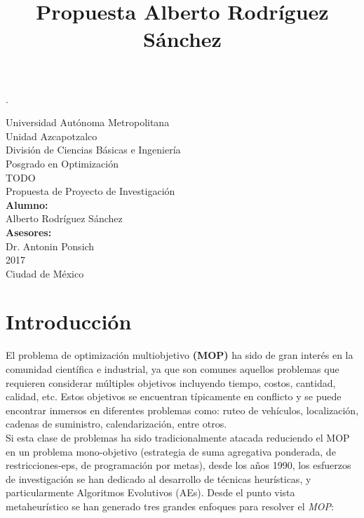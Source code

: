 \documentclass[letterpaper,10pt]{article}
\title{Propuesta Alberto Rodríguez Sánchez}
\begin{document}
\renewcommand{\refname}{Bibliografía}.
\thispagestyle{empty}

\begin{center}
    {\Huge Universidad Autónoma Metropolitana }\\
    {\huge Unidad Azcapotzalco}\\
    \vspace{0.5cm}
    {\Large División de Ciencias Básicas e Ingeniería}\\
    \vspace{1.0cm}
    {\large Posgrado en Optimización}\\
    \vspace{2.0cm}    
    {\Large TODO}\\
    \vspace{1.0cm}
    {\large Propuesta de Proyecto de Investigación}\\
    \vspace{2.0cm}
    {\large\textbf{Alumno:}}\\
    Alberto Rodríguez Sánchez\\
    \vspace{1.5cm}
    \bigskip
    {\large\textbf{Asesores:}}\\
    Dr. Antonin Ponsich\\
    
    \vspace{1.5cm}
     2017\\
    \vspace{1.0cm}
    Ciudad de México\\
\end{center}
\newpage
\tableofcontents
\newpage
\section{Introducción}

El problema de optimización multiobjetivo \textbf{(MOP)} ha sido de gran interés en la comunidad científica e industrial, ya que son comunes aquellos problemas que requieren
considerar múltiples objetivos incluyendo tiempo, costos, cantidad, calidad, etc. Estos objetivos se encuentran típicamente en conflicto y se puede encontrar inmersos en
diferentes problemas como: ruteo de vehículos, localización, cadenas de suministro, calendarización, entre otros.\\

Si esta clase de problemas ha sido tradicionalmente atacada reduciendo el MOP en un problema mono-objetivo (estrategia de suma agregativa ponderada, de restricciones-eps,
de programación por metas), desde los años 1990, los esfuerzos de investigación se han dedicado al desarrollo de técnicas heurísticas, y particularmente Algoritmos Evolutivos (AEs).
Desde el punto vista metaheurístico se han generado tres grandes enfoques para resolver el \emph{MOP}:
\end{document}
